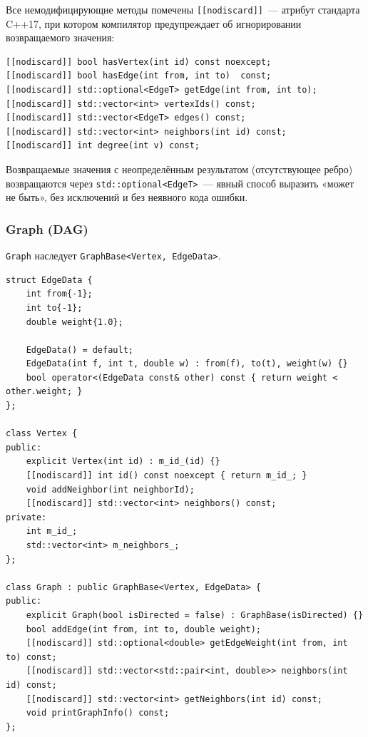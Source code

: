Все немодифицирующие методы помечены \texttt{[[nodiscard]]}~---
атрибут стандарта C++17, при котором компилятор предупреждает об игнорировании
возвращаемого значения:

\begin{lstlisting}[style=cppstyle, caption={Публичный интерфейс GraphBase (GraphBase.h)}]
[[nodiscard]] bool hasVertex(int id) const noexcept;
[[nodiscard]] bool hasEdge(int from, int to)  const;
[[nodiscard]] std::optional<EdgeT> getEdge(int from, int to);
[[nodiscard]] std::vector<int> vertexIds() const;
[[nodiscard]] std::vector<EdgeT> edges() const;
[[nodiscard]] std::vector<int> neighbors(int id) const;
[[nodiscard]] int degree(int v) const;
\end{lstlisting}

Возвращаемые значения с неопределённым результатом (отсутствующее ребро)
возвращаются через \texttt{std::optional<EdgeT>}~--- явный способ
выразить «может не быть», без исключений и без неявного кода ошибки.

\subsubsection{Graph (DAG)}

\texttt{Graph} наследует \texttt{GraphBase<Vertex, EdgeData>}.

\begin{lstlisting}[style=cppstyle, caption={Graph, Vertex, EdgeData (Graph.h)}]
struct EdgeData {
    int from{-1};
    int to{-1};
    double weight{1.0};

    EdgeData() = default;
    EdgeData(int f, int t, double w) : from(f), to(t), weight(w) {}
    bool operator<(EdgeData const& other) const { return weight < other.weight; }
};

class Vertex {
public:
    explicit Vertex(int id) : m_id_(id) {}
    [[nodiscard]] int id() const noexcept { return m_id_; }
    void addNeighbor(int neighborId);
    [[nodiscard]] std::vector<int> neighbors() const;
private:
    int m_id_;
    std::vector<int> m_neighbors_;
};

class Graph : public GraphBase<Vertex, EdgeData> {
public:
    explicit Graph(bool isDirected = false) : GraphBase(isDirected) {}
    bool addEdge(int from, int to, double weight);
    [[nodiscard]] std::optional<double> getEdgeWeight(int from, int to) const;
    [[nodiscard]] std::vector<std::pair<int, double>> neighbors(int id) const;
    [[nodiscard]] std::vector<int> getNeighbors(int id) const;
    void printGraphInfo() const;
};
\end{lstlisting}

